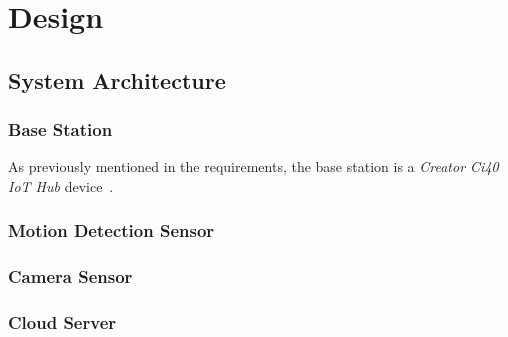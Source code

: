 \chapter{Design}

\section{System Architecture}

\subsection{Base Station}
As previously mentioned in the requirements, the base station is a
\textit{Creator Ci40 IoT Hub} device~\cite{creatorci40}.

\subsection{Motion Detection Sensor}

\subsection{Camera Sensor}

\subsection{Cloud Server}